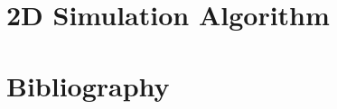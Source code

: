 \documentclass{article}
\begin{document}
\begin{comment}
At this point we have pushed the necessary structure for well-behaved environments to $A_L$ and $A_R$.  We now \emph{assume} that they

; fortunately there exists a transformation that computes $A_L$ and $A_R$ from $A$, and which furthermore in the infinite limit results in a state that is no different from the state consisting of only $A$'s.  The idea is as follows:  First, define $M_{(\alpha i)j}:=A^\alpha_{ij},$ that is flatten the $\alpha$ and $i$ index into a single index to form a matrix from the rank-3 tensor.  Now let $U\cdot S\cdot V$ be the singular value decomposition of $M$, and then define $A_L$ to be $U\cdot V$.  The fact that we have set all singular values to 1 and that $U$ and $V$ are unitaries together imply that $A_L$ is in left-canonical form.  An analogous procedure forms $A_R$ from $A$.

We have shown how to construct $A_L$ and $A_R$ from $A$, but we still need to construct $A_M$ and then show that the new state is equal to the old state.  To do this, we start by assuming that we have a finite 

We have shown that left- and right-canonical forms, respectively $A_L$ and $A_R$, can be derived from $A$, but we have yet to show that it is possible to replace all the left tensors with $A_L$ and the right tensors with $A_R$ while preserving the state.  To see this, first suppose that we have just two sites, both with tensor $A$.  Let $U\cdot S\cdot V$ be the singular value decomposition of $A$.  Then $A = A_L \cdot X$ where $X=V^\dagger\cdot S \cdot V$, where $V$ is unitary and $S$ is diagonal.  We thus define $A_M=X\cdot A$ and by construction it follows that the matrix product state with $A_L$ and $A_M$ is equal to the matrix product state with two $A$'s.  The same procedure allows us to derive $A_M$ and $A_R$ from two $A$'s.  Furthermore, for any finite system we can canonicalize the system starting at the left and the right and meeting at the middle
\end{comment}

\part{2D Simulation Algorithm}
\label{2dsim}

\part*{Bibliography}



\end{document}

